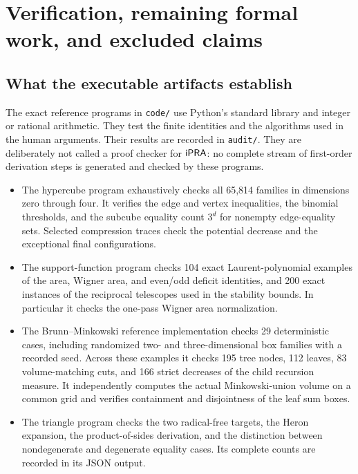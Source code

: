 \section{Verification, remaining formal work, and excluded claims}
\label{sec:validation}

\subsection{What the executable artifacts establish}

The exact reference programs in \texttt{code/} use Python's standard
library and integer or rational arithmetic. They test the finite identities
and the algorithms used in the human arguments. Their results are recorded
in \texttt{audit/}. They are deliberately not called a proof checker for
\(\mathsf{iPRA}\): no complete stream of first-order derivation steps is generated
and checked by these programs.

\begin{itemize}
\item The hypercube program exhaustively checks all 65,814 families in
dimensions zero through four. It verifies the edge and vertex inequalities,
the binomial thresholds, and the subcube equality count \(3^d\) for
nonempty edge-equality sets. Selected compression traces check the
potential decrease and the exceptional final configurations.
\item The support-function program checks 104 exact Laurent-polynomial
examples of the area, Wigner area, and even/odd deficit identities, and
200 exact instances of the reciprocal telescopes used in the stability
bounds. In particular it checks the one-pass Wigner area normalization.
\item The Brunn--Minkowski reference implementation checks 29 deterministic
cases, including randomized two- and three-dimensional box families with
a recorded seed. Across these examples it checks 195 tree nodes, 112
leaves, 83 volume-matching cuts, and 166 strict decreases of the child
recursion measure. It independently computes the actual Minkowski-union
volume on a common grid and verifies containment and disjointness of the
leaf sum boxes.
\item The triangle program checks the two radical-free targets, the
Heron expansion, the product-of-sides derivation, and the distinction
between nondegenerate and degenerate equality cases. Its complete counts
are recorded in its JSON output.
\end{itemize}

